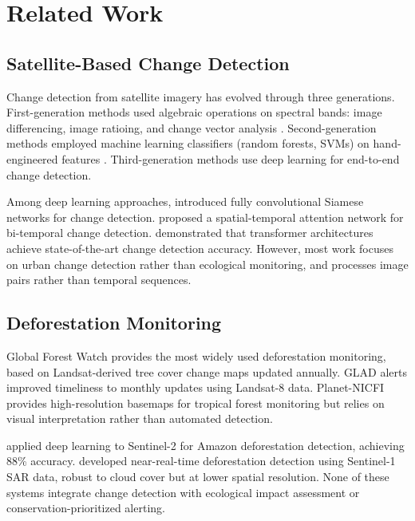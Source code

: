 \section{Related Work}

\label{sec:related}

\subsection{Satellite-Based Change Detection}

Change detection from satellite imagery has evolved through three generations.
First-generation methods used algebraic operations on spectral bands: image differencing, image ratioing, and change vector analysis \citep{singh1989review}.
Second-generation methods employed machine learning classifiers (random forests, SVMs) on hand-engineered features \citep{zhu2017change}.
Third-generation methods use deep learning for end-to-end change detection.

Among deep learning approaches, \citet{daudt2018fully} introduced fully convolutional Siamese networks for change detection.
\citet{chen2020spatial} proposed a spatial-temporal attention network for bi-temporal change detection.
\citet{zheng2021change} demonstrated that transformer architectures achieve state-of-the-art change detection accuracy.
However, most work focuses on urban change detection rather than ecological monitoring, and processes image pairs rather than temporal sequences.

\subsection{Deforestation Monitoring}

Global Forest Watch \citep{hansen2013high} provides the most widely used deforestation monitoring, based on Landsat-derived tree cover change maps updated annually.
GLAD alerts \citep{hansen2016humid} improved timeliness to monthly updates using Landsat-8 data.
Planet-NICFI \citep{planet2020nicfi} provides high-resolution basemaps for tropical forest monitoring but relies on visual interpretation rather than automated detection.

\citet{maretto2020spatio} applied deep learning to Sentinel-2 for Amazon deforestation detection, achieving 88\% accuracy.
\citet{ortega2021near} developed near-real-time deforestation detection using Sentinel-1 SAR data, robust to cloud cover but at lower spatial resolution.
None of these systems integrate change detection with ecological impact assessment or conservation-prioritized alerting.

